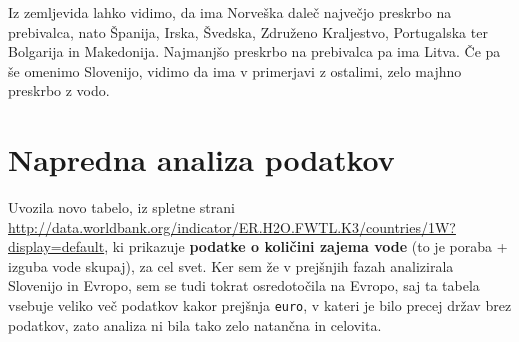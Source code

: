 \documentclass[11pt,a4paper]{article}
\begin{document}
Iz zemljevida lahko vidimo, da ima Norveška daleč največjo preskrbo na prebivalca, nato Španija, Irska, Švedska, Združeno Kraljestvo, Portugalska ter Bolgarija in Makedonija. Najmanjšo preskrbo na prebivalca pa ima Litva.
Če pa še omenimo Slovenijo, vidimo da ima v primerjavi z ostalimi, zelo majhno preskrbo z vodo.


\newpage

\section{Napredna analiza podatkov}

Uvozila novo tabelo, iz spletne strani \url{http://data.worldbank.org/indicator/ER.H2O.FWTL.K3/countries/1W?display=default}, ki prikazuje \textbf{podatke o količini zajema vode} (to je poraba + izguba vode skupaj), za cel svet. Ker sem že v prejšnjih fazah analizirala Slovenijo in Evropo, sem se tudi tokrat osredotočila na Evropo, saj ta tabela vsebuje veliko več podatkov kakor prejšnja \verb|euro|, v kateri je bilo precej držav brez podatkov, zato analiza ni bila tako zelo natančna in celovita.



\end{document}
